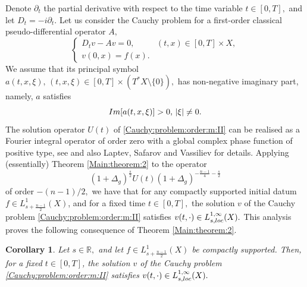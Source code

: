 \documentclass[12pt, reqno]{amsart}
\newtheorem{corollary}[theorem]{Corollary}
\theoremstyle{definition}
\theoremstyle{remark}
\numberwithin{equation}{section}
\begin{document}
Denote $\partial_t$ the partial derivative with respect to the time variable $t\in [0,T],$ and let $D_t=-i\partial_t.$ Let us consider the Cauchy problem for a first-order classical pseudo-differential operator $A,$
\begin{equation}\label{Cauchy:problem:order:m:II}\begin{cases}D_tv-A v=0 ,& (t,x)\in [0,T]\times X,
\\ v(0,x)=f(x) .&   \end{cases}
\end{equation} We assume that its principal symbol $a(t,x,\xi),\,(t,x,\xi)\in [0,T]\times (T^{*}X\setminus \{0\}),$ has non-negative imaginary part, namely, $a$ satisfies $$\textnormal{Im}[a(t,x,\xi)]> 0, \,|\xi|\neq 0.$$ The solution operator $U(t)$ of \eqref{Cauchy:problem:order:m:II} can be realised as a Fourier integral operator of order zero with a global complex phase function of positive type, see \cite[Page 117]{Ruzhansky:CWI-book} and also Laptev, Safarov and Vassiliev \cite{Laptev:Safarov:Vassiliev} for details. Applying (essentially) Theorem \ref{Main:theorem:2} to the operator $$(1+\Delta_g)^{\frac{s}{2}}U(t)(1+\Delta_g)^{-\frac{n-1}{4}-\frac{s}{2} }$$ of order $-(n-1)/2,$ we have that for any compactly supported initial datum $f\in L^1_{s+\frac{n-1}{2}}(X)$, and for a fixed time $t\in [0,T],$ the solution $v$ of the Cauchy problem \eqref{Cauchy:problem:order:m:II} satisfies $v(t,\cdot)\in L^{1,\infty}_{s,\textnormal{loc}}(X).$ This analysis proves the following consequence of Theorem \ref{Main:theorem:2}.
\begin{corollary}\label{Cor:1} Let $s\in \mathbb{R},$ and let $f\in L^1_{s+\frac{n-1}{2}}(X)$ be compactly supported. Then, for a fixed $t\in [0,T]$, the solution $v$ of the Cauchy problem \eqref{Cauchy:problem:order:m:II} satisfies $v(t,\cdot)\in L^{1,\infty}_{s,\textnormal{loc}}(X).$    
\end{corollary}
\end{document}
